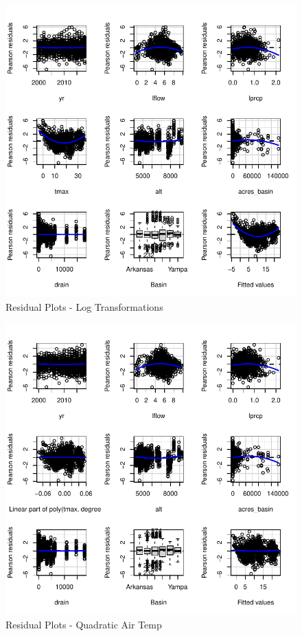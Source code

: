 \documentclass[
]{article}
\begin{document}
\begin{figure}
\centering
\includegraphics{D2P-Report_files/figure-latex/fig10-1.pdf}
\caption{\label{fig:figs10}Residual Plots - Log Transformations}
\end{figure}

\begin{figure}
\centering
\includegraphics{D2P-Report_files/figure-latex/fig11-1.pdf}
\caption{\label{fig:figs11}Residual Plots - Quadratic Air Temp}
\end{figure}
\end{document}
